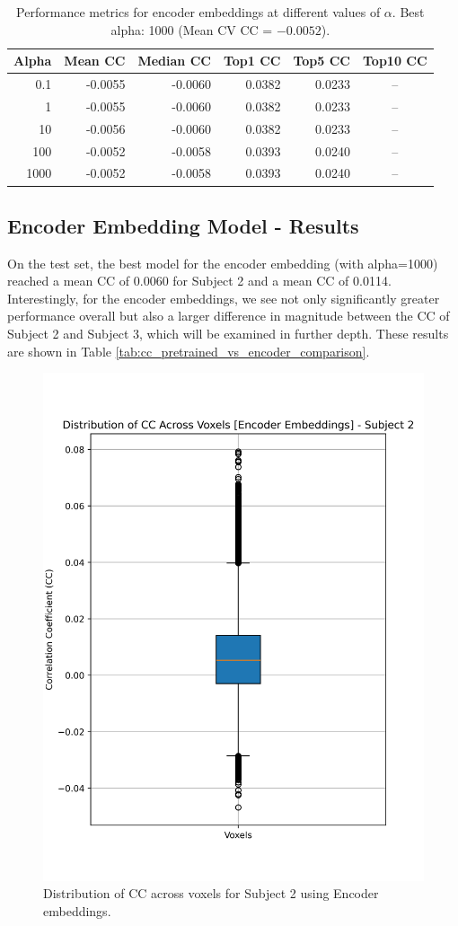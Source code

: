 \documentclass[10pt,letterpaper]{article}
\begin{document}
\begin{table}[ht]
\centering
\caption{Performance metrics for encoder embeddings at different values of $\alpha$. Best alpha: 1000 (Mean CV CC = $-0.0052$).}
\label{tab:encoder_cv}
\begin{tabular}{rrrrrr}
\toprule
\textbf{Alpha} & \textbf{Mean CC} & \textbf{Median CC} & \textbf{Top1 CC} & \textbf{Top5 CC} & \textbf{Top10 CC} \\
\midrule
0.1   & -0.0055 & -0.0060 & 0.0382 & 0.0233 & \multicolumn{1}{c}{--} \\
1     & -0.0055 & -0.0060 & 0.0382 & 0.0233 & \multicolumn{1}{c}{--} \\
10    & -0.0056 & -0.0060 & 0.0382 & 0.0233 & \multicolumn{1}{c}{--} \\
100   & -0.0052 & -0.0058 & 0.0393 & 0.0240 & \multicolumn{1}{c}{--} \\
1000  & -0.0052 & -0.0058 & 0.0393 & 0.0240 & \multicolumn{1}{c}{--} \\
\bottomrule
\end{tabular}
\end{table}

\subsection{Encoder Embedding Model - Results}

On the test set, the best model for the encoder embedding (with alpha=1000) reached a mean CC of 0.0060 for Subject 2 and a mean CC of 0.0114. Interestingly, for the encoder embeddings, we see not only significantly greater performance overall but also a larger difference in magnitude between the CC of Subject 2 and Subject 3, which will be examined in further depth. These results are shown in Table \ref{tab:cc_pretrained_vs_encoder_comparison}.


\begin{figure}[ht]
    \centering
    \includegraphics[width=0.5\linewidth]{figs/encoder_subj2_cc_dist.png}
    \caption{Distribution of CC across voxels for Subject 2 using Encoder embeddings.}
    \label{fig:cc_dist_encoder_subject_2}
\end{figure}
\end{document}
